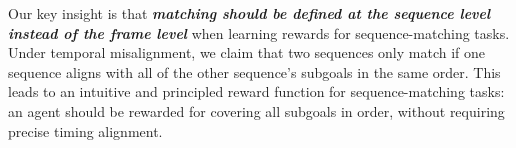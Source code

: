 



Our key insight is that \emph{\textbf{matching should be defined at the sequence level instead of the frame level}} when learning rewards for sequence-matching tasks. Under temporal misalignment, we claim that two sequences only match if one sequence aligns with all of the other sequence’s subgoals in the same order. This leads to an intuitive and principled reward function for sequence-matching tasks: an agent should be rewarded for covering all subgoals in order, without requiring precise timing alignment.


